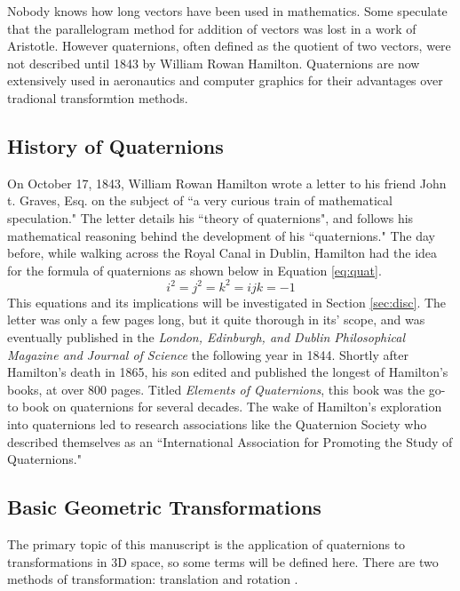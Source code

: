 Nobody knows how long vectors have been used in mathematics.
Some speculate that the parallelogram method for addition of vectors was lost in a work of Aristotle.
However quaternions, often defined as the quotient of two vectors, were not described until 1843 by William Rowan Hamilton.
Quaternions are now extensively used in aeronautics and computer graphics for their advantages over tradional transformtion methods.


\subsection{History of Quaternions}

On October 17, 1843, William Rowan Hamilton wrote a letter to his friend John t. Graves, Esq. on the subject of ``a very curious train of mathematical speculation."
The letter details his ``theory of quaternions", and follows his mathematical reasoning behind the development of his ``quaternions."
The day before, while walking across the Royal Canal in Dublin, Hamilton had the idea for the formula of quaternions as shown below in Equation \ref{eq:quat}.
\begin{equation}
\label{eq:quat}
i^2 = j^2 = k^2 = ijk = -1
\end{equation}
This equations and its implications will be investigated in Section \ref{sec:disc}.
The letter was only a few pages long, but it quite thorough in its' scope, and was eventually published in the \textit{London, Edinburgh, and Dublin Philosophical Magazine and Journal of Science} the following year in 1844.
Shortly after Hamilton's death in 1865, his son edited and published the longest of Hamilton's books, at over 800 pages.
Titled \textit{Elements of Quaternions}, this book was the go-to book on quaternions for several decades.
The wake of Hamilton's exploration into quaternions led to research associations like the Quaternion Society who described themselves as an ``International Association for Promoting the Study of Quaternions."

\subsection{Basic Geometric Transformations}

The primary topic of this manuscript is the application of quaternions to transformations in 3D space, so some terms will be defined here.
There are two methods of transformation: translation and rotation \cite{animation}.


